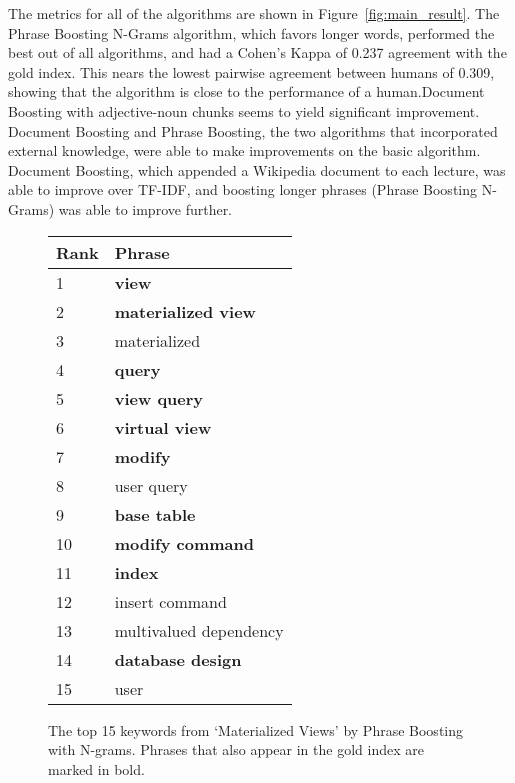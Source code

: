 The metrics for all of the algorithms are shown in
Figure~\ref{fig:main_result}. The Phrase Boosting N-Grams algorithm,
which favors longer words, performed the best out of all algorithms,
and had a Cohen's Kappa of 0.237 agreement with the gold index. This nears the
lowest pairwise agreement between humans of 0.309, showing that the
algorithm is close to the performance of a human.Document Boosting with adjective-noun chunks seems to
yield significant improvement. Document Boosting and Phrase Boosting, the two algorithms that
incorporated external knowledge, were able to make improvements on the
basic algorithm. Document Boosting, which appended a Wikipedia document to
each lecture, was able to improve over TF-IDF, and boosting
longer phrases (Phrase Boosting N-Grams) was able to improve
further. 

\begin{figure}[h]
\caption{The top 15 keywords from `Materialized Views' by Phrase
  Boosting with N-grams. Phrases that also appear in the gold index are marked in bold.}
\label{fig:top_15}
\begin{tabular}{|l|l|}
\hline
Rank & Phrase \\
\hline
1 & \textbf{view} \\
\hline
2 & \textbf{materialized view} \\
\hline
3 & materialized \\
\hline
4 & \textbf{query} \\
\hline
5 & \textbf{view query} \\
\hline
6 & \textbf{virtual view} \\
\hline
7 & \textbf{modify} \\
\hline
8 & user query \\
\hline
9 & \textbf{base table} \\
\hline
10 & \textbf{modify command} \\
\hline
11 & \textbf{index} \\
\hline
12 & insert command \\
\hline
13 & multivalued dependency \\
\hline
14 & \textbf{database design} \\
\hline
15 & user \\
\hline
\end{tabular}
\end{figure}

